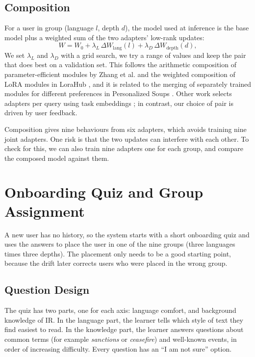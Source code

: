 \documentclass{FastFyp}
\begin{document}
\subsection{Composition}
For a user in group (language $l$, depth $d$), the model used at inference is the base model plus a weighted sum of the two adapters' low-rank updates:
\begin{equation}
W = W_0 + \lambda_L\,\Delta W_{\mathrm{lang}}(l) + \lambda_D\,\Delta W_{\mathrm{depth}}(d),
\end{equation}
We set $\lambda_L$ and $\lambda_D$ with a grid search, we try a range of values and keep the pair that does best on a validation set. This follows the arithmetic composition of parameter-efficient modules by Zhang et al. \cite{zhang2023composing} and the weighted composition of LoRA modules in LoraHub \cite{huang2024lorahub}, and it is related to the merging of separately trained modules for different preferences in Personalized Soups \cite{jang2023personalized}. Other work selects adapters per query using task embeddings \cite{dhasade2026lorauter}; in contrast, our choice of pair is driven by user feedback.

Composition gives nine behaviours from six adapters, which avoids training nine joint adapters. One risk is that the two updates can interfere with each other. To check for this, we can also train nine adapters one for each group, and compare the composed model against them.



\section{Onboarding Quiz and Group Assignment}
\label{sec:onboarding}
A new user has no history, so the system starts with a short onboarding quiz and uses the answers to place the user in one of the nine groups (three languages times three depths). The placement only needs to be a good starting point, because the drift later corrects users who were placed in the wrong group.

\subsection{Question Design}
The quiz has two parts, one for each axis: language comfort, and background knowledge of IR. In the language part, the learner tells which style of text they find easiest to read. In the knowledge part, the learner answers questions about common terms (for example \emph{sanctions} or \emph{ceasefire}) and well-known events, in order of increasing difficulty. Every question has an ``I am not sure'' option.
\end{document}
